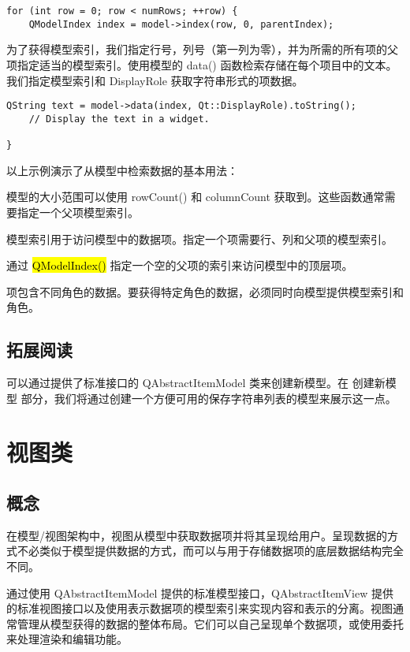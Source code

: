 \begin{lstlisting}
for (int row = 0; row < numRows; ++row) {
    QModelIndex index = model->index(row, 0, parentIndex);
\end{lstlisting}

为了获得模型索引，我们指定行号，列号（第一列为零），并为所需的所有项的父项指定适当的模型索引。使用模型的 data() 函数检索存储在每个项目中的文本。我们指定模型索引和 DisplayRole 获取字符串形式的项数据。

\begin{lstlisting}
QString text = model->data(index, Qt::DisplayRole).toString();
    // Display the text in a widget.

}
\end{lstlisting}

以上示例演示了从模型中检索数据的基本用法：

\begin{compactitem}
\item 模型的大小范围可以使用 rowCount() 和 columnCount 获取到。这些函数通常需要指定一个父项模型索引。
\item 模型索引用于访问模型中的数据项。指定一个项需要行、列和父项的模型索引。
\item 通过 \hl{QModelIndex()} 指定一个空的父项的索引来访问模型中的顶层项。
\item 项包含不同角色的数据。要获得特定角色的数据，必须同时向模型提供模型索引和角色。
\end{compactitem}


\subsection{拓展阅读}

可以通过提供了标准接口的 QAbstractItemModel 类来创建新模型。在 创建新模型 部分，我们将通过创建一个方便可用的保存字符串列表的模型来展示这一点。

\section{视图类}
\subsection{概念}

在模型/视图架构中，视图从模型中获取数据项并将其呈现给用户。呈现数据的方式不必类似于模型提供数据的方式，而可以与用于存储数据项的底层数据结构完全不同。

通过使用 QAbstractItemModel 提供的标准模型接口，QAbstractItemView 提供的标准视图接口以及使用表示数据项的模型索引来实现内容和表示的分离。视图通常管理从模型获得的数据的整体布局。它们可以自己呈现单个数据项，或使用委托来处理渲染和编辑功能。

